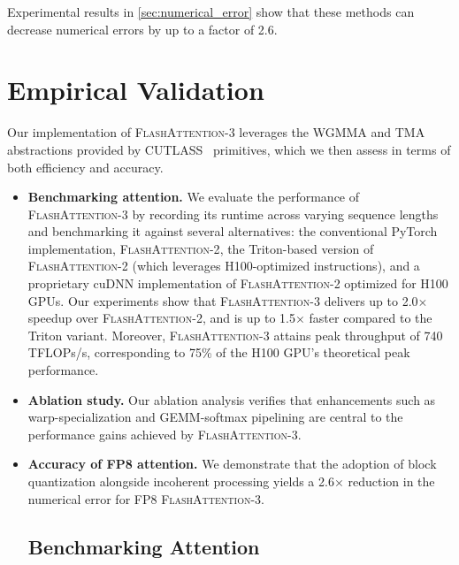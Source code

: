 \begin{algorithm}[H]
\begin{algorithmic}[1]
Experimental results in \cref{sec:numerical_error} show that these methods can decrease numerical errors by up to a factor of 2.6.

\section{Empirical Validation}
\label{sec:exp}

Our implementation of \textsc{FlashAttention-3} leverages the WGMMA and TMA abstractions provided by CUTLASS~\citep{Thakkar_CUTLASS_2023} primitives, which we then assess in terms of both efficiency and accuracy.

\begin{itemize}

\item \textbf{Benchmarking attention.} We evaluate the performance of \textsc{FlashAttention-3} by recording its runtime across varying sequence lengths and benchmarking it against several alternatives: the conventional PyTorch implementation, \textsc{FlashAttention-2}, the Triton-based version of \textsc{FlashAttention-2} (which leverages H100-optimized instructions), and a proprietary cuDNN implementation of \textsc{FlashAttention-2} optimized for H100 GPUs. Our experiments show that \textsc{FlashAttention-3} delivers up to 2.0$\times$ speedup over \textsc{FlashAttention-2}, and is up to 1.5$\times$ faster compared to the Triton variant. Moreover, \textsc{FlashAttention-3} attains peak throughput of 740 TFLOPs/s, corresponding to 75\% of the H100 GPU's theoretical peak performance.
\item \textbf{Ablation study.} Our ablation analysis verifies that enhancements such as warp-specialization and GEMM-softmax pipelining are central to the performance gains achieved by \textsc{FlashAttention-3}.
\item \textbf{Accuracy of FP8 attention.} We demonstrate that the adoption of block quantization alongside incoherent processing yields a 2.6$\times$ reduction in the numerical error for FP8 \textsc{FlashAttention-3}.

\subsection{Benchmarking Attention}
\label{subsec:benchmark_attn}


\end{itemize}
\end{algorithmic}
\end{algorithm}
